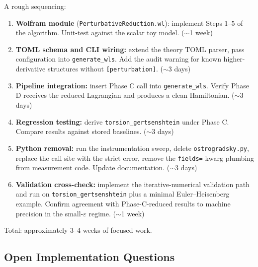 A rough sequencing:

\begin{enumerate}
  \item \textbf{Wolfram module} (\texttt{PerturbativeReduction.wl}): implement Steps 1--5 of the algorithm. Unit-test against the scalar toy model. ($\sim$1 week)
  \item \textbf{TOML schema and CLI wiring:} extend the theory TOML parser, pass configuration into \texttt{generate\_wls}. Add the audit warning for known higher-derivative structures without \texttt{[perturbation]}. ($\sim$3 days)
  \item \textbf{Pipeline integration:} insert Phase C call into \texttt{generate\_wls}. Verify Phase D receives the reduced Lagrangian and produces a clean Hamiltonian. ($\sim$3 days)
  \item \textbf{Regression testing:} derive \texttt{torsion\_gertsenshtein} under Phase C. Compare results against stored baselines. ($\sim$3 days)
  \item \textbf{Python removal:} run the instrumentation sweep, delete \texttt{ostrogradsky.py}, replace the call site with the strict error, remove the \texttt{fields=} kwarg plumbing from measurement code. Update documentation. ($\sim$3 days)
  \item \textbf{Validation cross-check:} implement the iterative-numerical validation path and run on \texttt{torsion\_gertsenshtein} plus a minimal Euler--Heisenberg example. Confirm agreement with Phase-C-reduced results to machine precision in the small-$\varepsilon$ regime. ($\sim$1 week)
\end{enumerate}

Total: approximately 3--4 weeks of focused work.

\subsection{Open Implementation Questions}
\label{sec:prd-open-questions}

